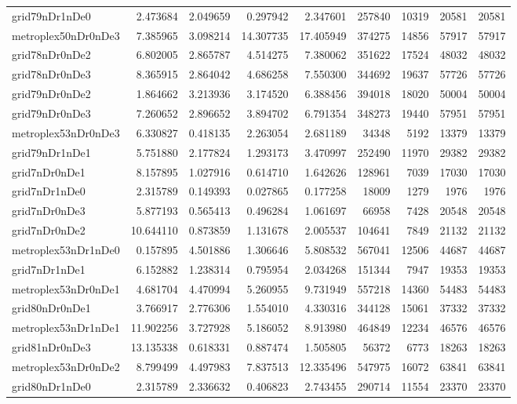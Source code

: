 \begin{longtable}{|l|r|r|r|r|r|r|r|r|}
grid79nDr1nDe0 & 2.473684 & 2.049659 & 0.297942 & 2.347601 & 257840 & 10319 & 20581 & 20581 \\
metroplex50nDr0nDe3 & 7.385965 & 3.098214 & 14.307735 & 17.405949 & 374275 & 14856 & 57917 & 57917 \\
grid78nDr0nDe2 & 6.802005 & 2.865787 & 4.514275 & 7.380062 & 351622 & 17524 & 48032 & 48032 \\
grid78nDr0nDe3 & 8.365915 & 2.864042 & 4.686258 & 7.550300 & 344692 & 19637 & 57726 & 57726 \\
grid79nDr0nDe2 & 1.864662 & 3.213936 & 3.174520 & 6.388456 & 394018 & 18020 & 50004 & 50004 \\
grid79nDr0nDe3 & 7.260652 & 2.896652 & 3.894702 & 6.791354 & 348273 & 19440 & 57951 & 57951 \\
metroplex53nDr0nDe3 & 6.330827 & 0.418135 & 2.263054 & 2.681189 & 34348 & 5192 & 13379 & 13379 \\
grid79nDr1nDe1 & 5.751880 & 2.177824 & 1.293173 & 3.470997 & 252490 & 11970 & 29382 & 29382 \\
grid7nDr0nDe1 & 8.157895 & 1.027916 & 0.614710 & 1.642626 & 128961 & 7039 & 17030 & 17030 \\
grid7nDr1nDe0 & 2.315789 & 0.149393 & 0.027865 & 0.177258 & 18009 & 1279 & 1976 & 1976 \\
grid7nDr0nDe3 & 5.877193 & 0.565413 & 0.496284 & 1.061697 & 66958 & 7428 & 20548 & 20548 \\
grid7nDr0nDe2 & 10.644110 & 0.873859 & 1.131678 & 2.005537 & 104641 & 7849 & 21132 & 21132 \\
metroplex53nDr1nDe0 & 0.157895 & 4.501886 & 1.306646 & 5.808532 & 567041 & 12506 & 44687 & 44687 \\
grid7nDr1nDe1 & 6.152882 & 1.238314 & 0.795954 & 2.034268 & 151344 & 7947 & 19353 & 19353 \\
metroplex53nDr0nDe1 & 4.681704 & 4.470994 & 5.260955 & 9.731949 & 557218 & 14360 & 54483 & 54483 \\
grid80nDr0nDe1 & 3.766917 & 2.776306 & 1.554010 & 4.330316 & 344128 & 15061 & 37332 & 37332 \\
metroplex53nDr1nDe1 & 11.902256 & 3.727928 & 5.186052 & 8.913980 & 464849 & 12234 & 46576 & 46576 \\
grid81nDr0nDe3 & 13.135338 & 0.618331 & 0.887474 & 1.505805 & 56372 & 6773 & 18263 & 18263 \\
metroplex53nDr0nDe2 & 8.799499 & 4.497983 & 7.837513 & 12.335496 & 547975 & 16072 & 63841 & 63841 \\
grid80nDr1nDe0 & 2.315789 & 2.336632 & 0.406823 & 2.743455 & 290714 & 11554 & 23370 & 23370 \\

\end{longtable}
